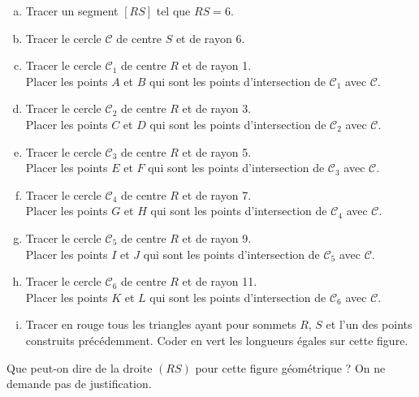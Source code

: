 \begin{enumerate}[(a)]
    \item Tracer un segment $[RS]$ tel que $RS=6$.
    \item Tracer le cercle $\mathcal{C}$ de centre $S$ et de rayon 6.
    \item Tracer le cercle $\mathcal{C}_1$ de centre $R$ et de rayon 1.\\
    Placer les points $A$ et $B$ qui sont les points d'intersection de $\mathcal{C}_1$ avec $\mathcal{C}$.
    \item Tracer le cercle $\mathcal{C}_2$ de centre $R$ et de rayon 3.\\
    Placer les points $C$ et $D$ qui sont les points d'intersection de $\mathcal{C}_2$ avec $\mathcal{C}$.
    \item Tracer le cercle $\mathcal{C}_3$ de centre $R$ et de rayon 5.\\
    Placer les points $E$ et $F$ qui sont les points d'intersection de $\mathcal{C}_3$ avec $\mathcal{C}$.
    \item Tracer le cercle $\mathcal{C}_4$ de centre $R$ et de rayon 7.\\
    Placer les points $G$ et $H$ qui sont les points d'intersection de $\mathcal{C}_4$ avec $\mathcal{C}$.
    \item Tracer le cercle $\mathcal{C}_5$ de centre $R$ et de rayon 9.\\
    Placer les points $I$ et $J$ qui sont les points d'intersection de $\mathcal{C}_5$ avec $\mathcal{C}$.
    \item Tracer le cercle $\mathcal{C}_6$ de centre $R$ et de rayon 11.\\
    Placer les points $K$ et $L$ qui sont les points d'intersection de $\mathcal{C}_6$ avec $\mathcal{C}$.
    \item Tracer en rouge tous les triangles ayant pour sommets $R$, $S$ et l'un des points construits précédemment.
    Coder en vert les longueurs égales sur cette figure.
\end{enumerate}

\vskip 0.2cm

Que peut-on dire de la droite $(RS)$ pour cette figure géométrique
? On ne demande pas de justification.